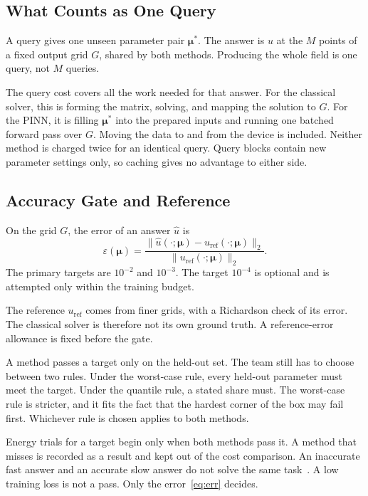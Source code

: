 \documentclass[journal]{IEEEtran}
\begin{document}
\subsection{What Counts as One Query}
A query gives one unseen parameter pair $\boldsymbol{\mu}^\ast$. The answer is $u$ at the $M$ points of a fixed output grid $G$, shared by both methods. Producing the whole field is one query, not $M$ queries.

The query cost covers all the work needed for that answer. For the classical solver, this is forming the matrix, solving, and mapping the solution to $G$. For the PINN, it is filling $\boldsymbol{\mu}^\ast$ into the prepared inputs and running one batched forward pass over $G$. Moving the data to and from the device is included. Neither method is charged twice for an identical query. Query blocks contain new parameter settings only, so caching gives no advantage to either side.

\subsection{Accuracy Gate and Reference}
On the grid $G$, the error of an answer $\hat u$ is
\begin{equation}
\varepsilon(\boldsymbol{\mu})=\frac{\lVert\hat u(\cdot;\boldsymbol{\mu})-u_{\mathrm{ref}}(\cdot;\boldsymbol{\mu})\rVert_2}{\lVert u_{\mathrm{ref}}(\cdot;\boldsymbol{\mu})\rVert_2}.
\label{eq:err}
\end{equation}
The primary targets are $10^{-2}$ and $10^{-3}$. The target $10^{-4}$ is optional and is attempted only within the training budget.

The reference $u_{\mathrm{ref}}$ comes from finer grids, with a Richardson check of its error. The classical solver is therefore not its own ground truth. A reference-error allowance is fixed before the gate.

A method passes a target only on the held-out set. The team still has to choose between two rules. Under the worst-case rule, every held-out parameter must meet the target. Under the quantile rule, a stated share must. The worst-case rule is stricter, and it fits the fact that the hardest corner of the box may fail first. Whichever rule is chosen applies to both methods.

Energy trials for a target begin only when both methods pass it. A method that misses is recorded as a result and kept out of the cost comparison. An inaccurate fast answer and an accurate slow answer do not solve the same task~\cite{mcgreivy2024}. A low training loss is not a pass. Only the error~\eqref{eq:err} decides.
\end{document}
